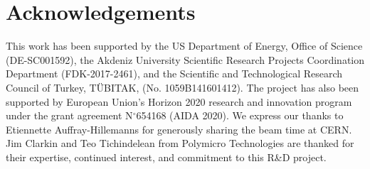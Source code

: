 \documentclass[a4paper,11pt]{article}
\begin{document}

\section{Acknowledgements}
This work has been supported by the US Department of Energy, Office of Science (DE-SC001592), the Akdeniz University Scientific Research Projects Coordination Department (FDK-2017-2461), and the Scientific and Technological Research Council of Turkey, T\"UBITAK, (No. 1059B141601412). The project has also been supported by European Union's Horizon 2020 research and innovation program under the grant agreement N$^\circ$654168 (AIDA 2020). We express our thanks to Etiennette Auffray-Hillemanns for generously sharing the beam time at CERN. Jim Clarkin and Teo Tichindelean from Polymicro Technologies are thanked for their expertise, continued interest, and commitment to this R\&D project.




\end{document}
